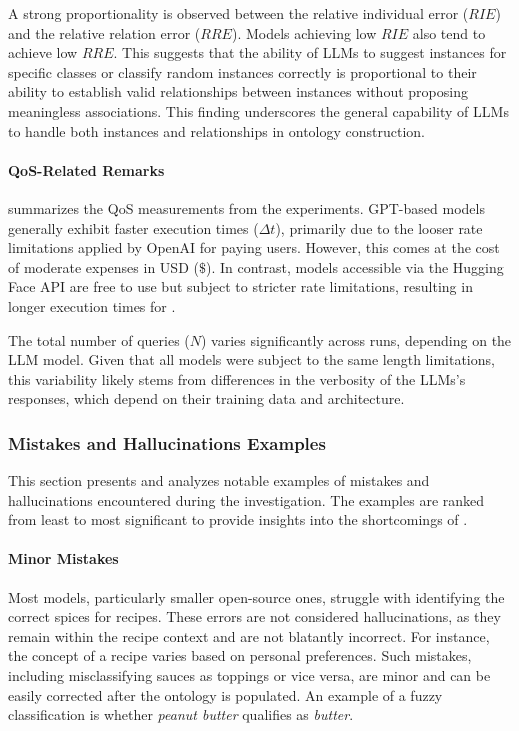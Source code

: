 A strong proportionality is observed between the relative individual error (\(\mathit{RIE}\)) and the relative relation error (\(\mathit{RRE}\)).
%
Models achieving low \(\mathit{RIE}\) also tend to achieve low \(\mathit{RRE}\).
%
This suggests that the ability of \glspl{LLM} to suggest instances for specific classes or classify random instances correctly is proportional to their ability to establish valid relationships between instances without proposing meaningless associations.
%
This finding underscores the general capability of \glspl{LLM} to handle both instances and relationships in ontology construction.


\paragraph{\Gls{QoS}-Related Remarks}
%

%
 summarizes the \gls{QoS} measurements from the experiments.
%
GPT-based models generally exhibit faster execution times (\(\Delta t\)), primarily due to the looser rate limitations applied by OpenAI for paying users.
%
However, this comes at the cost of moderate expenses in USD (\(\$\)).
%
In contrast, models accessible via the Hugging Face API are free to use but subject to stricter rate limitations, resulting in longer execution times for \llmfkg{}.

The total number of queries (\(N\)) varies significantly across runs, depending on the \gls{LLM} model.
%
Given that all models were subject to the same length limitations, this variability likely stems from differences in the verbosity of the \glspl{LLM}'s responses, which depend on their training data and architecture.

\subsubsection{Mistakes and Hallucinations Examples}
\label{subsubsec:interesting_samples}
%
This section presents and analyzes notable examples of mistakes and hallucinations encountered during the investigation.
%
The examples are ranked from least to most significant to provide insights into the shortcomings of \llmfkg{}.

\paragraph{Minor Mistakes}
%
Most models, particularly smaller open-source ones, struggle with identifying the correct spices for recipes.
%
These errors are not considered hallucinations, as they remain within the recipe context and are not blatantly incorrect.
%
For instance, the concept of a recipe varies based on personal preferences.
%
Such mistakes, including misclassifying sauces as toppings or vice versa, are minor and can be easily corrected after the ontology is populated.
%
An example of a fuzzy classification is whether \emph{peanut butter} qualifies as \emph{butter}.

